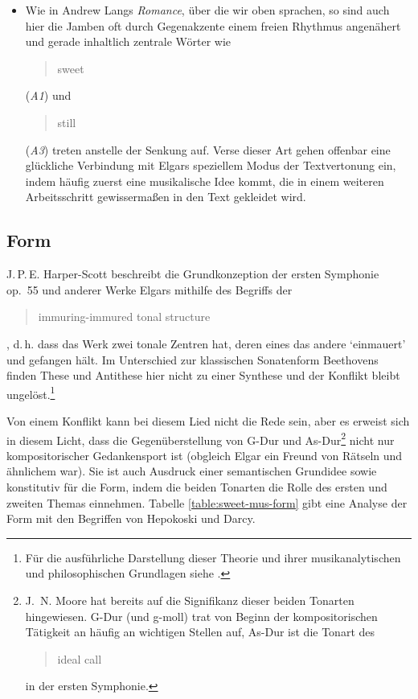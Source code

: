 \documentclass[a4paper,11pt,open=any]{scrbook}
\newcommand{\engquote}[1]{\foreignblockquote{english}{#1}}
\begin{document}
\begin{itemize}
 \item Wie in Andrew Langs \textit{Romance}, über die wir oben sprachen, so
 sind auch hier die Jamben oft durch Gegenakzente einem freien Rhythmus
 angenähert und gerade inhaltlich zentrale Wörter wie \engquote{sweet}
 (\textit{A1}) und \engquote{still} (\textit{A3}) treten anstelle der Senkung
 auf.  Verse dieser Art gehen offenbar eine glückliche Verbindung mit Elgars
 speziellem Modus der Textvertonung ein, indem häufig zuerst eine musikalische
 Idee kommt, die in einem weiteren Arbeitsschritt gewissermaßen in den Text
 gekleidet wird.
\end{itemize}

\subsection*{Form}
J.\,P.\,E. Harper-Scott beschreibt die Grundkonzeption der ersten
Symphonie op.~55 und anderer Werke Elgars mithilfe des Begriffs der
\engquote{immuring-immured tonal structure}, d.\,h. dass das Werk zwei
tonale Zentren hat, deren eines das andere \enquote*{einmauert} und
gefangen hält.  Im Unterschied zur klassischen Sonatenform Beethovens
finden These und Antithese hier nicht zu einer Synthese und der Konflikt
bleibt ungelöst.\footnote{Für die ausführliche Darstellung dieser Theorie
und ihrer musikanalytischen und philosophischen Grundlagen siehe
\cite{harperscott2006}.}

Von einem Konflikt kann bei diesem Lied nicht die Rede sein, aber es
erweist sich in diesem Licht, dass die Gegenüberstellung von G-Dur und
As-Dur\footnote{J.~N. Moore \parencite[524]{moore} hat bereits auf die
Signifikanz dieser beiden Tonarten hingewiesen.  G-Dur (und g-moll) trat
von Beginn der kompositorischen Tätigkeit an häufig an wichtigen Stellen
auf, As-Dur ist die Tonart des \engquote{ideal call} in der ersten
Symphonie.} nicht nur kompositorischer Gedankensport ist (obgleich Elgar
ein Freund von Rätseln und ähnlichem war).  Sie ist auch Ausdruck einer
semantischen Grundidee sowie konstitutiv für die Form, indem die beiden
Tonarten die Rolle des ersten und zweiten Themas einnehmen.  Tabelle
\vref{table:sweet-mus-form} gibt eine Analyse der Form mit den
Begriffen von Hepokoski und Darcy\cite{hepokoski-darcy}.
\end{document}
